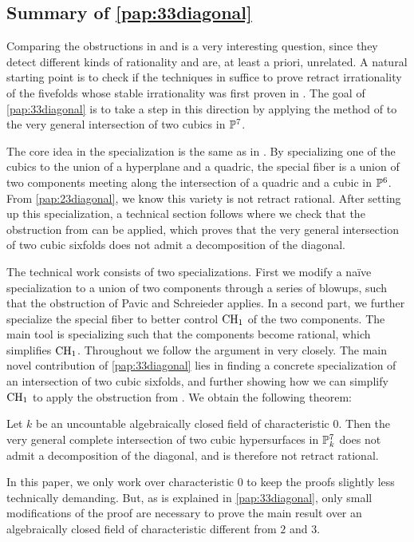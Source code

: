 \subsection{Summary of \cref{pap:33diagonal}}
Comparing the obstructions in \cite{NicaiseOttem} and \cite{PavicSchreieder} is a very interesting question, since they detect different kinds of rationality and are, at least a priori, unrelated. A natural starting point is to check if the techniques in \cite{PavicSchreieder} suffice to prove retract irrationality of the fivefolds whose stable irrationality was first proven in \cite{NicaiseOttem}. The goal of \cref{pap:33diagonal} is to take a step in this direction by applying the method of \cite{PavicSchreieder} to the very general intersection of two cubics in $\P^7$.

The core idea in the specialization is the same as in \cite[Theorem 7.2]{NicaiseOttem}. By specializing one of the cubics to the union of a hyperplane and a quadric, the special fiber is a union of two components meeting along the intersection of a quadric and a cubic in $\P^6$. From \cref{pap:23diagonal}, we know this variety is not retract rational. After setting up this specialization, a technical section follows where we check that the obstruction from \cite{PavicSchreieder} can be applied, which proves that the very general intersection of two cubic sixfolds does not admit a decomposition of the diagonal.

The technical work consists of two specializations. First we modify a naïve specialization to a union of two components through a series of blowups, such that the obstruction of Pavic and Schreieder applies. In a second part, we further specialize the special fiber to better control $\CH_1$ of the two components. The main tool is specializing such that the components become rational, which simplifies $\CH_1$. Throughout we follow the argument in \cite{PavicSchreieder} very closely. The main novel contribution of \cref{pap:33diagonal} lies in finding a concrete specialization of an intersection of two cubic sixfolds, and further showing how we can simplify $\CH_1$ to apply the obstruction from \cite{PavicSchreieder}. We obtain the following theorem:
\begin{theorem}
	Let $k$ be an uncountable algebraically closed field of characteristic $0$. Then the very general complete intersection of two cubic hypersurfaces in $\P^7_k$ does not admit a decomposition of the diagonal, and is therefore not retract rational.
\end{theorem}
In this paper, we only work over characteristic $0$ to keep the proofs slightly less technically demanding. But, as is explained in \cref{pap:33diagonal}, only small modifications of the proof are necessary to prove the main result over an algebraically closed field of characteristic different from $2$ and $3$.

